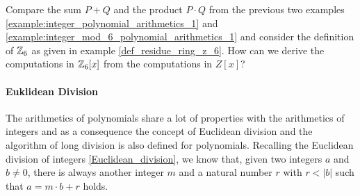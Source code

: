 \begin{exercise}
Compare the sum $P+Q$ and the product $P\cdot Q$ from the previous two examples \ref{example:integer_polynomial_arithmetics_1} and \ref{example:integer_mod_6_polynomial_arithmetics_1} and consider the definition of $\mathbb{Z}_6$ as given in example \ref{def_residue_ring_z_6}. How can we derive the computations in $\mathbb{Z}_6[x]$ from the computations in $Z[x]$? 
\end{exercise}
\paragraph{Euklidean Division}
The arithmetics of polynomials share a lot of properties with the arithmetics of integers and as a consequence the concept of Euclidean division and the algorithm of long division is also defined for polynomials. Recalling the Euclidean division of integers \ref{Euclidean_division}, we know that, given two integers $a$ and $b\neq 0$, there is always another integer $m$ and a natural number $r$ with $r<|b|$ such that $a = m\cdot b +r$ holds.

